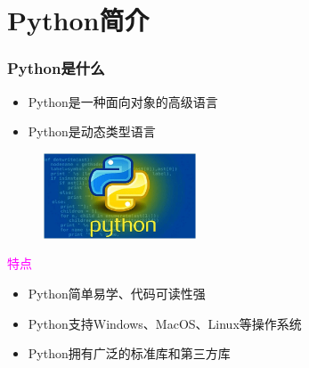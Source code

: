 \small
\section{\rm{Python}简介}
\begin{frame}
	\frametitle{\textrm{Python}是什么}
	\begin{itemize}
		\item \textrm{Python}是一种面向对象的高级语言\\
			{\fontsize{7.2pt}{4.2pt}\selectfont{支持面向对象的风格或代码封装在对象的技术}}
		\item \textrm{Python}是动态类型语言\\
			{\fontsize{7.2pt}{4.2pt}\selectfont{变量类型在运行时确定，代码实现灵活}}
	\end{itemize}
\begin{figure}[h!]
\vspace*{-0.10in}
\centering
\includegraphics[height=1.0in, width=1.8in, viewport=0 0 602 339,clip]{Figures/python-experts.png}
\label{Python-experts}
\end{figure}
\textcolor{magenta}{特点}%
	\begin{itemize}
		\item \textrm{Python}简单易学、代码可读性强
		\item \textrm{Python}支持\textrm{Windows}、\textrm{MacOS}、\textrm{Linux}等操作系统\\
			{\fontsize{7.2pt}{4.2pt}\selectfont{可以在不同的平台上无缝运行，而无需修改代码}}
		\item \textrm{Python}拥有广泛的标准库和第三方库
	\end{itemize}
\end{frame}

